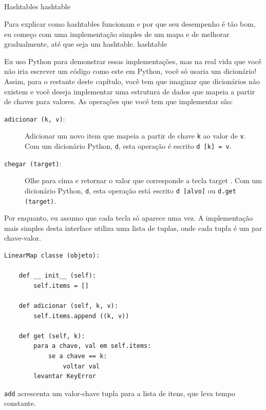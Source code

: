 \documentclass[10pt]{book}
\begin{document}
\begin{exercise}
\begin{v erbatim}
\section{} Hashtables
\label{} hashtable

Para explicar como hashtables funcionam e por que seu desempenho é tão
bom, eu começo com uma implementação simples de um mapa e de
melhorar gradualmente, até que seja um hashtable.
\index{} hashtable

Eu uso Python para demonstrar essas implementações, mas na real
vida que você não iria escrever um código como este em Python, você só usaria um
dicionário! Assim, para o restante deste capítulo, você tem que imaginar que
dicionários não existem e você deseja implementar uma estrutura de dados
que mapeia a partir de chaves para valores. As operações que você tem que
implementar são:

\begin{description}

\item[{\tt adicionar (k, v)}:] Adicionar um novo item que mapeia a partir de chave {\tt k}
ao valor de {\tt v}. Com um dicionário Python, {\tt d}, esta operação
é escrito {\tt d [k] = v}.

\item[{\tt chegar (target)}:] Olhe para cima e retornar o valor que corresponde
a tecla {target \tt}. Com um dicionário Python, {\tt d}, esta operação
está escrito {\tt d [alvo]} ou {\tt d.get (target)}.

\end{description}

Por enquanto, eu assumo que cada tecla só aparece uma vez.
A implementação mais simples desta interface utiliza uma lista de
tuplas, onde cada tupla é um par chave-valor.

\begin{verbatim}
LinearMap classe (objeto):

    def __ init__ (self):
        self.items = []

    def adicionar (self, k, v):
        self.items.append ((k, v))

    def get (self, k):
        para a chave, val em self.items:
            se a chave == k:
                voltar val
        levantar KeyError
\end{verbatim}

{\tt add} acrescenta um valor-chave tupla para a lista de itens, que
leva tempo constante.


\end{v erbatim}
\end{exercise}
\end{document}
